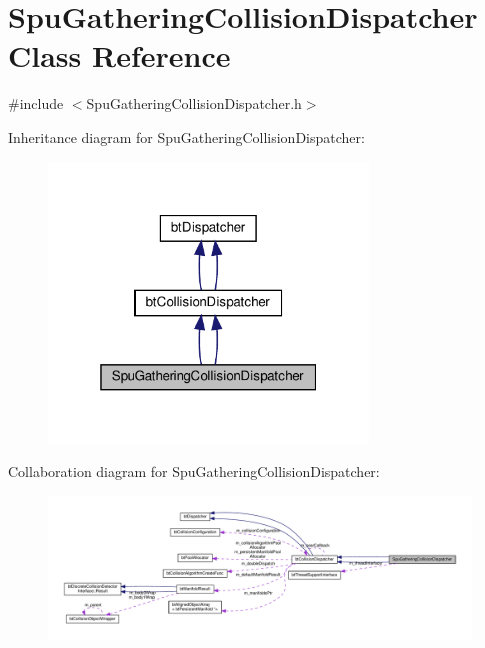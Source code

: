 \hypertarget{classSpuGatheringCollisionDispatcher}{}\section{Spu\+Gathering\+Collision\+Dispatcher Class Reference}
\label{classSpuGatheringCollisionDispatcher}


{\ttfamily \#include $<$Spu\+Gathering\+Collision\+Dispatcher.\+h$>$}



Inheritance diagram for Spu\+Gathering\+Collision\+Dispatcher\+:
\nopagebreak
\begin{figure}[H]
\begin{center}
\leavevmode
\includegraphics[width=241pt]{classSpuGatheringCollisionDispatcher__inherit__graph}
\end{center}
\end{figure}


Collaboration diagram for Spu\+Gathering\+Collision\+Dispatcher\+:
\nopagebreak
\begin{figure}[H]
\begin{center}
\leavevmode
\includegraphics[width=350pt]{classSpuGatheringCollisionDispatcher__coll__graph}
\end{center}
\end{figure}
